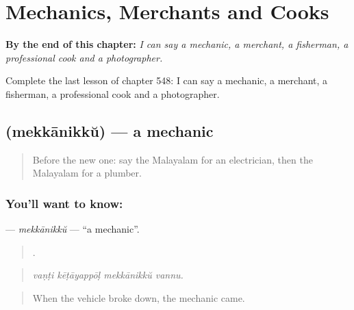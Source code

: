 
\chapter{Mechanics, Merchants and Cooks}
\label{ch:ml-mechanics-merchants-and-cooks}

\begin{chapteropening}
\textbf{By the end of this chapter:} \emph{I can say a mechanic, a merchant, a fisherman, a professional cook and a photographer.}

Complete the last lesson of chapter 548: I can say a mechanic, a merchant, a fisherman, a professional cook and a photographer.
\end{chapteropening}

\section[\texorpdfstring{\ml{മെക്കാനിക്ക്} (mekkānikkŭ)}{മെക്കാനിക്ക് (mekkānikkŭ)}]{ (mekkānikkŭ) — a mechanic}

\label{lesson:ML-C548-mekkanikku}



\begin{quote}
Before the new one: say the Malayalam for an electrician, then the Malayalam for a plumber.
\end{quote}

\subsection*{You'll want to know: }
\textbf{} — \emph{mekkānikkŭ} — \textquotedblleft{}a mechanic\textquotedblright{}.

\begin{quote}
   .
\end{quote}

\begin{quote}
\emph{vaṇṭi kēṭāyappōḷ mekkānikkŭ vannu.}
\end{quote}

\begin{quote}
When the vehicle broke down, the mechanic came.
\end{quote}

